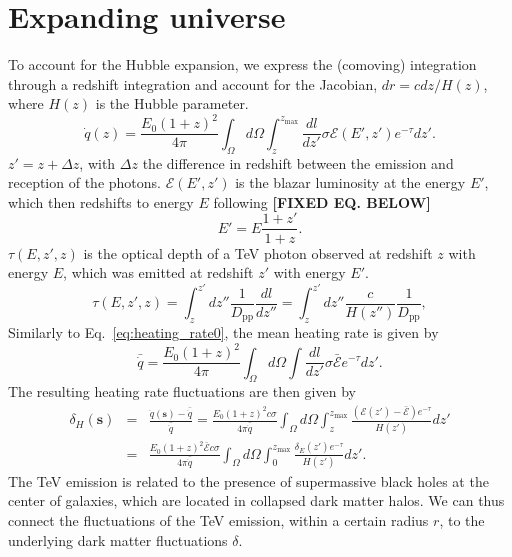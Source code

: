 \documentclass[twocolumns]{emulateapj}
\newcommand\Ec[1]{{\color{magenta} \bf #1}} %
\begin{document}
\section{Expanding universe}\label{sec:window_exp}

To account for the Hubble expansion, we express the (comoving) integration through a redshift integration and account for the Jacobian, $dr=c dz /H(z)$, where  $H(z)$ is the Hubble parameter.
\begin{equation}
  \label{eq:int_exp_heat}
  \dot{q}(z)=\frac{E_0(1+z)^2}{4\pi}\int_{\Omega}d\Omega\int_z^{z_{\mathrm{max}}}\frac{dl}{dz'}\sigma 
\mathcal{E}(E',z') e^{-\tau} dz'.
\end{equation}
$z'=z+\Delta z$, with $\Delta z$ the difference in redshift between the emission and reception of the photons.
$\mathcal{E}(E',z')$ is the blazar luminosity at the energy $E'$, which then redshifts to energy $E$ following \Ec{[FIXED EQ. BELOW]}
\begin{equation}
\label{eq:E_z}
E'=E\frac{1+z'}{1+z}.
\end{equation}
$\tau(E,z',z)$ is the optical depth of a TeV photon observed at redshift $z$ with energy $E$, which was emitted at redshift $z'$ with energy $E'$.
\begin{equation}
\label{eq:tau}
\tau(E,z',z)=\int_z^{z'}dz''\frac{1}{D_{\mathrm{pp}}}\frac{dl}{dz''}=\int_z^{z'}dz''\frac{c}{H(z'')}\frac{1}{D_{\mathrm{pp}}},
\end{equation}
Similarly to Eq.~\eqref{eq:heating_rate0}, the mean heating rate is given by
\begin{equation}
\label{eq:mean_exp_heat}
\bar{\dot{q}}=\frac{E_0(1+z)^2}{4\pi}\int_{\Omega}d\Omega\int \frac{dl}{dz'}\sigma\bar{\mathcal{E}} e^{-\tau}dz'.
\end{equation}
The resulting heating rate fluctuations are then given by
\begin{eqnarray}
\label{eq:fluc_exp0}
\delta_H(\mathbf{s})&=&\frac{\dot{q}(\mathbf{s})-\bar{\dot{q}}}{\bar{\dot{q}}}=\frac{E_0(1+z)^2c\sigma}{4\pi\bar{\dot{q}}} \int_{\Omega}d\Omega\int_z^{z_{\mathrm{max}}} \frac{ ( \mathcal{E}(z')-\bar{\mathcal{E}}) e^{-\tau}}{H(z')} dz' \\ \nonumber
&=&\frac{E_0(1+z)^2\bar{\mathcal{E}} c\sigma}{4\pi\bar{\dot{q}}} \int_{\Omega}d\Omega\int_0^{z_{\mathrm{max}}} \frac{\delta_E(z') e^{-\tau}}{H(z')}dz'.
\end{eqnarray}
The TeV emission is related to the presence of supermassive black holes at the center of galaxies, which are located in collapsed dark matter halos. We can thus connect the fluctuations of the TeV emission, within a certain radius $r$, to the underlying dark matter fluctuations $\delta$.
\end{document}
